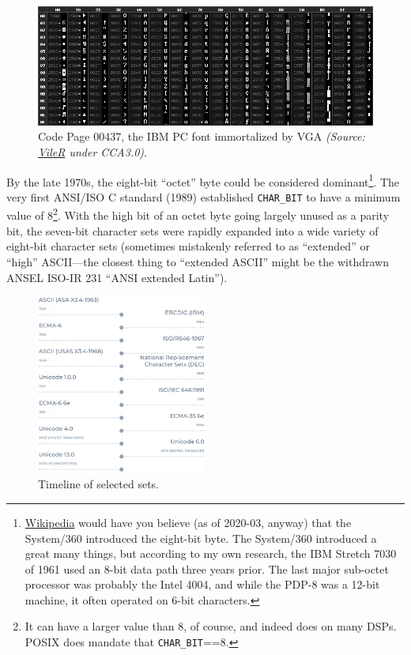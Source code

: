 \begin{figure}[!htb]
  \centering
  \includegraphics[width=.5\linewidth]{media/chart437.png}
  \caption[The legendary Code Page 00437.]{Code Page 00437, the IBM PC font immortalized by VGA \textit{(Source: \href{https://int10h.org/oldschool-pc-fonts/readme/}{VileR} under CCA3.0)}.}
  \label{fig:cp437}
\end{figure}

By the late 1970s, the eight-bit ``octet'' byte could be considered
dominant\footnote{\href{https://en.wikipedia.org/wiki/8-bit\_computing}{Wikipedia}
would have you believe (as of 2020-03, anyway) that the System/360 introduced
the eight-bit byte. The System/360 introduced a great many things, but
according to my own research, the IBM Stretch 7030 of 1961 used an 8-bit data
path three years prior\cite{ibmstretch}. The last major sub-octet processor
was probably the Intel 4004, and while the PDP-8 was a 12-bit machine, it
often operated on 6-bit characters.}. The very first ANSI/ISO C standard
(1989) established \texttt{CHAR\_BIT} to have a minimum value of 8\footnote{It
can have a larger value than 8, of course, and indeed does on many
DSPs\cite{cookcharbit}. POSIX does mandate that \texttt{CHAR\_BIT}==8.}. With
the high bit of an octet byte going largely unused as a parity bit, the
seven-bit character sets were rapidly expanded into a wide variety of eight-bit
character sets (sometimes mistakenly referred to as ``extended'' or ``high''
ASCII---the closest thing to ``extended ASCII'' might be the withdrawn ANSEL
ISO-IR 231 ``ANSI extended Latin''\cite{ansel}).

\begin{figure}
\centering
\includegraphics[width=0.5\textwidth]{media/charset-timeline.png}
\caption{Timeline of selected sets.}
\label{fig:charset-timeline}
\end{figure}

